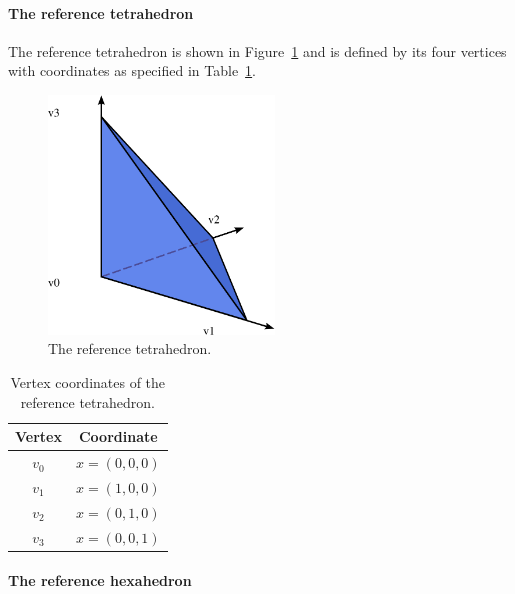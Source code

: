 \paragraph{The reference tetrahedron}

The reference tetrahedron is shown in Figure~\ref{fig:tetrahedron} and
is defined by its four vertices with coordinates as specified in
Table~\ref{tab:tetrahedron,vertices}.

\begin{figure}
  \begin{center}
    \includegraphics[width=6cm]{chapters/alnes-2/pdf/tetrahedron.pdf}
    \caption{The reference tetrahedron.}
    \label{fig:tetrahedron}
  \end{center}
\end{figure}

\begin{table}
\linespread{1.2}\selectfont
  \begin{center}
    \begin{tabular}{|c|c|}
      \hline
      Vertex & Coordinate \\
      \hline
      \hline
      $v_0$ & $x = (0, 0, 0)$ \\
      \hline
      $v_1$ & $x = (1, 0, 0)$ \\
      \hline
      $v_2$ & $x = (0, 1, 0)$ \\
      \hline
      $v_3$ & $x = (0, 0, 1)$ \\
      \hline
    \end{tabular}
    \caption{Vertex coordinates of the reference tetrahedron.}
    \label{tab:tetrahedron,vertices}
  \end{center}
\end{table}

\paragraph{The reference hexahedron}

